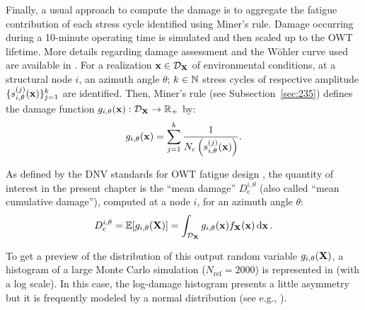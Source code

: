 Finally, a usual approach to compute the damage is to aggregate the fatigue contribution of each stress cycle identified using Miner’s rule. 
Damage occurring during a 10-minute operating time is simulated and then scaled up to the OWT lifetime. 
More details regarding damage assessment and the W\"ohler curve used are available in \citet[Sec. 2.4.6]{dnv_fatigue_2016}. 
For a realization ${\bf x} \in \mathcal{D}_{{\bf X}}$ of environmental conditions, at a structural node $i$, an azimuth angle $\theta$; $k \in \mathbb{N}$ stress cycles of respective amplitude $\{s_{i, \theta}^{(j)}({\bf x})\}_{j=1}^k$ are identified. 
Then, Miner's rule (see Subsection~\ref{sec:235}) defines the damage function $g_{i, \theta}({\bf x}): \mathcal{D}_{{\bf X}} \rightarrow \mathbb{R}_+$ by:
\begin{equation}
    g_{i, \theta}({\bf x}) = \sum_{j=1}^{k} \frac{1}{N_{\mathrm{c}}\left(s_{i, \theta}^{(j)}({\bf x})\right)}.
    \label{eq:miner1}
\end{equation}

As defined by the DNV standards for OWT fatigue design \citep{dnv_fatigue_2016}, the quantity of interest in the present chapter is the ``mean damage'' $D_{\mathrm{c}}^{i, \theta}$ (also called ``mean cumulative damage''), computed at a node $i$, for an azimuth angle $\theta$:
\begin{equation}
    D_{\mathrm{c}}^{i, \theta} = \mathbb{E}[g_{i, \theta}({\bf X})] = \int_{\mathcal{D}_{\bf X}} g_{i, \theta}({\bf x}) f_{{\bf X}}({\bf x})\, \mathrm{d} {\bf x} \,.
    \label{eq:mean_integral}
\end{equation}

To get a preview of the distribution of this output random variable $g_{i, \theta}({\bf X})$, a histogram of a large Monte Carlo simulation ($N_{\mathrm{ref}}=2000$) is represented in  (with a log scale). 
In this case, the log-damage histogram presents a little asymmetry but it is frequently modeled by a normal distribution (see e.g., \citealp{teixeira_2019}). 

